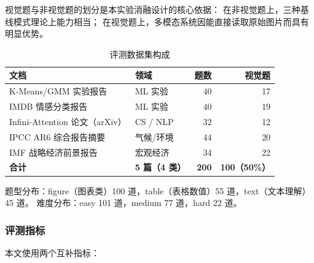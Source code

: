 ﻿\documentclass[UTF8, heading=true]{ctexart}
\begin{document}
视觉题与非视觉题的划分是本实验消融设计的核心依据：
在非视觉题上，三种基线模式理论上能力相当；
在视觉题上，多模态系统因能直接读取原始图片而具有明显优势。

\begin{table}[H]
\centering
\caption{评测数据集构成}
\begin{tabular}{llrr}
\toprule
\textbf{文档} & \textbf{领域} & \textbf{题数} & \textbf{视觉题} \\
\midrule
K-Means/GMM 实验报告 & ML 实验 & 40 & 17 \\
IMDB 情感分类报告 & ML 实验 & 40 & 19 \\
Infini-Attention 论文（arXiv） & CS / NLP & 32 & 12 \\
IPCC AR6 综合报告摘要 & 气候/环境 & 44 & 20 \\
IMF 战略经济前景报告 & 宏观经济 & 34 & 22 \\
\textbf{合计} & \textbf{5 篇（4 类）} & \textbf{200} & \textbf{100（50\%）} \\
\bottomrule
\end{tabular}
\label{tab:dataset}
\end{table}

题型分布：figure（图表类）100 道，table（表格数值）55 道，text（文本理解）45 道。
难度分布：easy 101 道，medium 77 道，hard 22 道。

\subsubsection{评测指标}

本文使用两个互补指标：
\end{document}
